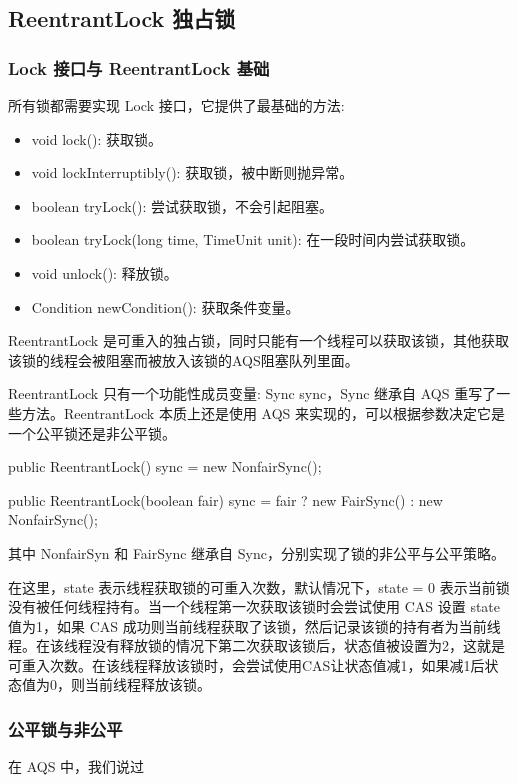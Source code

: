 \subsection{ReentrantLock 独占锁}

\subsubsection*{Lock 接口与 ReentrantLock 基础}

所有锁都需要实现 Lock 接口，它提供了最基础的方法:
\begin{itemize}
    \item void lock(): 获取锁。
    \item void lockInterruptibly(): 获取锁，被中断则抛异常。
    \item boolean tryLock(): 尝试获取锁，不会引起阻塞。
    \item boolean tryLock(long time, TimeUnit unit): 在一段时间内尝试获取锁。
    \item void unlock(): 释放锁。
    \item Condition newCondition(): 获取条件变量。
\end{itemize}

ReentrantLock 是可重入的独占锁，同时只能有一个线程可以获取该锁，其他获取该锁的线程会被阻塞而被放入该锁的AQS阻塞队列里面。

ReentrantLock 只有一个功能性成员变量: Sync sync，Sync 继承自 AQS 重写了一些方法。ReentrantLock 本质上还是使用 AQS 来实现的，可以根据参数决定它是一个公平锁还是非公平锁。

\begin{Java}
public ReentrantLock() {
    sync = new NonfairSync();
}

public ReentrantLock(boolean fair) {
    sync = fair ? new FairSync() : new NonfairSync();
}
\end{Java}

其中 NonfairSyn 和 FairSync 继承自 Sync，分别实现了锁的非公平与公平策略。

在这里，state 表示线程获取锁的可重入次数，默认情况下，state = 0 表示当前锁没有被任何线程持有。当一个线程第一次获取该锁时会尝试使用 CAS 设置 state 值为1，如果 CAS 成功则当前线程获取了该锁，然后记录该锁的持有者为当前线程。在该线程没有释放锁的情况下第二次获取该锁后，状态值被设置为2，这就是可重入次数。在该线程释放该锁时，会尝试使用CAS让状态值减1，如果减1后状态值为0，则当前线程释放该锁。

\subsubsection*{公平锁与非公平}

在 AQS 中，我们说过
















\newpage